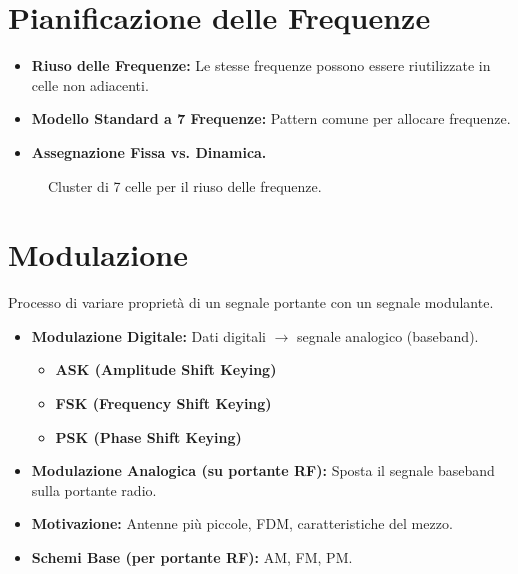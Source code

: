 \section{Pianificazione delle Frequenze}
\begin{itemize}
    \item \textbf{Riuso delle Frequenze:} Le stesse frequenze possono essere riutilizzate in celle non adiacenti.
    \item \textbf{Modello Standard a 7 Frequenze:} Pattern comune per allocare frequenze.
    \item \textbf{Assegnazione Fissa vs. Dinamica.}
\end{itemize}
\begin{figure}[H]
\centering
{}
\caption{Cluster di 7 celle per il riuso delle frequenze.}
\label{fig:frequency_planning}
\end{figure}

\section{Modulazione}
Processo di variare proprietà di un segnale portante con un segnale modulante.
\begin{itemize}
    \item \textbf{Modulazione Digitale:} Dati digitali $\rightarrow$ segnale analogico (baseband).
    \begin{itemize}
        \item \textbf{ASK (Amplitude Shift Keying)}
        \item \textbf{FSK (Frequency Shift Keying)}
        \item \textbf{PSK (Phase Shift Keying)}
    \end{itemize}
    \item \textbf{Modulazione Analogica (su portante RF):} Sposta il segnale baseband sulla portante radio.
    \item \textbf{Motivazione:} Antenne più piccole, FDM, caratteristiche del mezzo.
    \item \textbf{Schemi Base (per portante RF):} AM, FM, PM.
\end{itemize}


